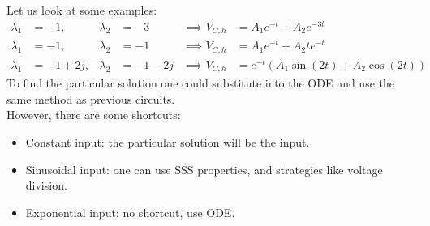 \documentclass[nobib]{tufte-handout}
\begin{document}
Let us look at some examples:\\
\begin{align*}
    \lambda_1 & = -1 ,   & \lambda_2 & =-3    & \implies V_{C,h} & = A_1e^{-t}+A_2e^{-3t}            \\
    \lambda_1 & =-1 ,    & \lambda_2 & =-1    & \implies V_{C,h} & = A_1e^{-t}+A_2te^{-t}            \\
    \lambda_1 & = -1+2j, & \lambda_2 & =-1-2j & \implies V_{C,h} & = e^{-t}(A_1\sin(2t)+A_2\cos(2t))
\end{align*}
To find the particular solution one could substitute into the ODE and use the same method as previous circuits.\\
However, there are some shortcuts:
\begin{itemize}
    \item Constant input: the particular solution will be the input.
    \item Sinusoidal input: one can use SSS properties, and strategies like voltage
          division.
    \item Exponential input: no shortcut, use ODE.
\end{itemize}
\end{document}
